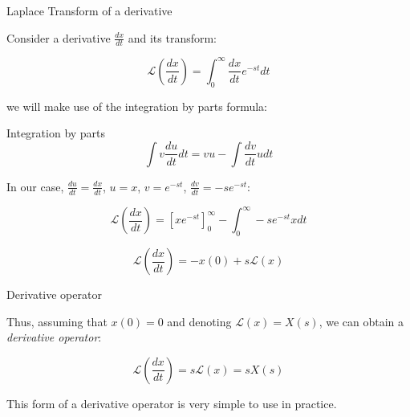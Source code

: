 \documentclass{beamer}
\begin{document}
\begin{frame}{Laplace Transform of a derivative}
\begin{flushleft}

Consider a derivative $\frac{dx}{dt}$ and its transform:

\begin{equation}
    \mathcal{L}\left(\frac{dx}{dt}\right) = \int_0^\infty \frac{dx}{dt} e^{-st}dt
\end{equation}

we will make use of the integration by parts formula:

\begin{block}{Integration by parts}
\begin{equation}
\int v \frac{du}{dt} dt = vu - 
\int \frac{dv}{dt} u dt    
\end{equation}
\end{block}

In our case, $\frac{du}{dt} = \frac{dx}{dt}$, $u = x$, $v = e^{-st}$, $\frac{dv}{dt} = -se^{-st}$:

\begin{equation}
\mathcal{L}\left(\frac{dx}{dt}\right) = \left[x e^{-st} \right]_0^\infty - 
\int_0^\infty -se^{-st} x dt  
\end{equation}

\begin{equation}
\mathcal{L}\left(\frac{dx}{dt}\right) = -x(0) + s\mathcal{L}(x)  
\end{equation}

\end{flushleft}
\end{frame}




\begin{frame}{Derivative operator}
\begin{flushleft}

Thus, assuming that $x(0) = 0$ and denoting $\mathcal{L}\left( x \right) = X(s)$, we can obtain a \emph{derivative operator}:

\begin{equation}
\label{eq:NoIC_laplace}
\mathcal{L}\left(\frac{dx}{dt}\right) = s \mathcal{L}\left(x\right) = s X(s)
\end{equation}

\bigskip

This form of a derivative operator is very simple to use in practice.

\end{flushleft}
\end{frame}
\end{document}
